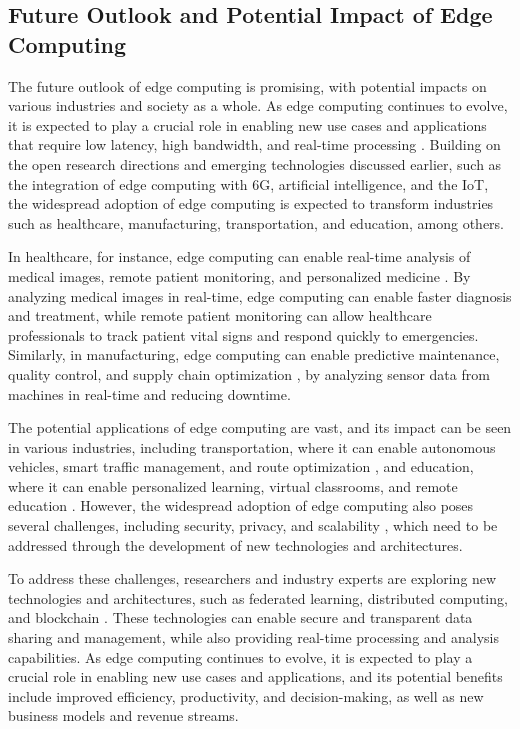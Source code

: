 \documentclass[11pt]{article}
\begin{document}
\subsection{Future Outlook and Potential Impact of Edge Computing}

The future outlook of edge computing is promising, with potential impacts on various industries and society as a whole. As edge computing continues to evolve, it is expected to play a crucial role in enabling new use cases and applications that require low latency, high bandwidth, and real-time processing \cite{ref1}. Building on the open research directions and emerging technologies discussed earlier, such as the integration of edge computing with 6G, artificial intelligence, and the IoT, the widespread adoption of edge computing is expected to transform industries such as healthcare, manufacturing, transportation, and education, among others.

In healthcare, for instance, edge computing can enable real-time analysis of medical images, remote patient monitoring, and personalized medicine \cite{ref215}. By analyzing medical images in real-time, edge computing can enable faster diagnosis and treatment, while remote patient monitoring can allow healthcare professionals to track patient vital signs and respond quickly to emergencies. Similarly, in manufacturing, edge computing can enable predictive maintenance, quality control, and supply chain optimization \cite{ref159}, by analyzing sensor data from machines in real-time and reducing downtime.

The potential applications of edge computing are vast, and its impact can be seen in various industries, including transportation, where it can enable autonomous vehicles, smart traffic management, and route optimization \cite{ref19}, and education, where it can enable personalized learning, virtual classrooms, and remote education \cite{ref216}. However, the widespread adoption of edge computing also poses several challenges, including security, privacy, and scalability \cite{ref16}, which need to be addressed through the development of new technologies and architectures.

To address these challenges, researchers and industry experts are exploring new technologies and architectures, such as federated learning, distributed computing, and blockchain \cite{ref217}. These technologies can enable secure and transparent data sharing and management, while also providing real-time processing and analysis capabilities. As edge computing continues to evolve, it is expected to play a crucial role in enabling new use cases and applications, and its potential benefits include improved efficiency, productivity, and decision-making, as well as new business models and revenue streams.
\end{document}

